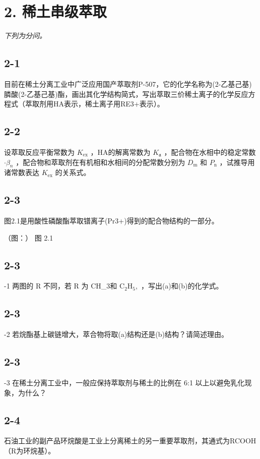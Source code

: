\section*{2. 稀土串级萃取}
\textit{下列为分问。}

\subsection*{2-1}
⽬前在稀⼟分离⼯业中⼴泛应⽤国产萃取剂P-507，它的化学名称为(2-⼄基⼰基)膦酸(2-⼄基⼰基)酯，画出其化学结构简式，写出萃取三价稀⼟离⼦的化学反应⽅程式（萃取剂⽤HA表⽰，稀⼟离⼦⽤RE3+表⽰）。

\subsection*{2-2}
设萃取反应平衡常数为 $K _ { \mathrm { e x } }$ ，HA的解离常数为 $K _ { \mathfrak { a } }$ ，配合物在⽔相中的稳定常数 $\cdot \beta _ { n }$ ，配合物和萃取剂在有机相和⽔相间的分配常数分别为 $D _ { \mathrm { m } }$ 和 $P _ { \mathrm { n } }$ ，试推导⽤诸常数表达 $K _ { \mathrm { e x } }$ 的关系式。

\subsection*{2-3}
图2.1是⽤酸性磷酸酯萃取镨离⼦(Pr3+)得到的配合物结构的⼀部分。

（图：）
图 2.1

\subsection*{2-3}
-1 两图的 R 不同，若 R 为 CH_{3}和 ${ \mathrm { C } } _ { 2 } { \mathrm { H } } _ { 5 } ,$ ，写出(a)和(b)的化学式。

\subsection*{2-3}
-2 若烷酯基上碳链增⼤，萃合物将取(a)结构还是(b)结构？请简述理由。

\subsection*{2-3}
-3 在稀⼟分离⼯业中，⼀般应保持萃取剂与稀⼟的⽐例在 6:1 以上以避免乳化现象，为什么？

\subsection*{2-4}
⽯油⼯业的副产品环烷酸是⼯业上分离稀⼟的另⼀重要萃取剂，其通式为RCOOH（R为环烷基）。

